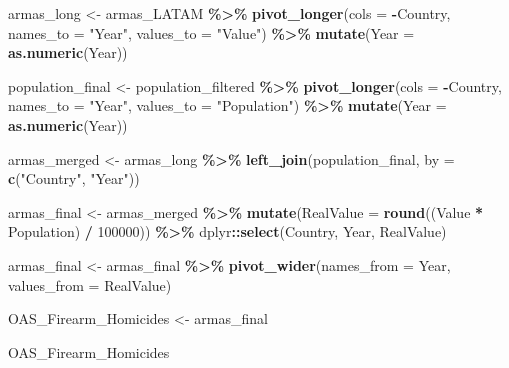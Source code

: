 \documentclass[
  11pt,
]{article}
\newenvironment{Shaded}{\begin{snugshade}}{\end{snugshade}}
\newcommand{\AttributeTok}[1]{\textcolor[rgb]{0.13,0.29,0.53}{#1}}
\newcommand{\DecValTok}[1]{\textcolor[rgb]{0.00,0.00,0.81}{#1}}
\newcommand{\FunctionTok}[1]{\textcolor[rgb]{0.13,0.29,0.53}{\textbf{#1}}}
\newcommand{\NormalTok}[1]{#1}
\newcommand{\OtherTok}[1]{\textcolor[rgb]{0.56,0.35,0.01}{#1}}
\newcommand{\SpecialCharTok}[1]{\textcolor[rgb]{0.81,0.36,0.00}{\textbf{#1}}}
\newcommand{\StringTok}[1]{\textcolor[rgb]{0.31,0.60,0.02}{#1}}
\begin{document}
\begin{Shaded}
\begin{Highlighting}[]
\NormalTok{armas\_long }\OtherTok{\textless{}{-}}\NormalTok{ armas\_LATAM }\SpecialCharTok{\%\textgreater{}\%}
  \FunctionTok{pivot\_longer}\NormalTok{(}\AttributeTok{cols =} \SpecialCharTok{{-}}\NormalTok{Country, }\AttributeTok{names\_to =} \StringTok{"Year"}\NormalTok{, }\AttributeTok{values\_to =} \StringTok{"Value"}\NormalTok{) }\SpecialCharTok{\%\textgreater{}\%}
  \FunctionTok{mutate}\NormalTok{(}\AttributeTok{Year =} \FunctionTok{as.numeric}\NormalTok{(Year))}

\NormalTok{population\_final }\OtherTok{\textless{}{-}}\NormalTok{ population\_filtered }\SpecialCharTok{\%\textgreater{}\%}
  \FunctionTok{pivot\_longer}\NormalTok{(}\AttributeTok{cols =} \SpecialCharTok{{-}}\NormalTok{Country, }\AttributeTok{names\_to =} \StringTok{"Year"}\NormalTok{, }\AttributeTok{values\_to =} \StringTok{"Population"}\NormalTok{) }\SpecialCharTok{\%\textgreater{}\%}
  \FunctionTok{mutate}\NormalTok{(}\AttributeTok{Year =} \FunctionTok{as.numeric}\NormalTok{(Year))}

\NormalTok{armas\_merged }\OtherTok{\textless{}{-}}\NormalTok{ armas\_long }\SpecialCharTok{\%\textgreater{}\%}
  \FunctionTok{left\_join}\NormalTok{(population\_final, }\AttributeTok{by =} \FunctionTok{c}\NormalTok{(}\StringTok{"Country"}\NormalTok{, }\StringTok{"Year"}\NormalTok{))}

\NormalTok{armas\_final }\OtherTok{\textless{}{-}}\NormalTok{ armas\_merged }\SpecialCharTok{\%\textgreater{}\%}
  \FunctionTok{mutate}\NormalTok{(}\AttributeTok{RealValue =} \FunctionTok{round}\NormalTok{((Value }\SpecialCharTok{*}\NormalTok{ Population) }\SpecialCharTok{/} \DecValTok{100000}\NormalTok{)) }\SpecialCharTok{\%\textgreater{}\%}
\NormalTok{  dplyr}\SpecialCharTok{::}\FunctionTok{select}\NormalTok{(Country, Year, RealValue)}

\NormalTok{armas\_final }\OtherTok{\textless{}{-}}\NormalTok{ armas\_final }\SpecialCharTok{\%\textgreater{}\%}
  \FunctionTok{pivot\_wider}\NormalTok{(}\AttributeTok{names\_from =}\NormalTok{ Year, }\AttributeTok{values\_from =}\NormalTok{ RealValue)}

\NormalTok{OAS\_Firearm\_Homicides }\OtherTok{\textless{}{-}}\NormalTok{ armas\_final}

\NormalTok{OAS\_Firearm\_Homicides}
\end{Highlighting}
\end{Shaded}
\end{document}
